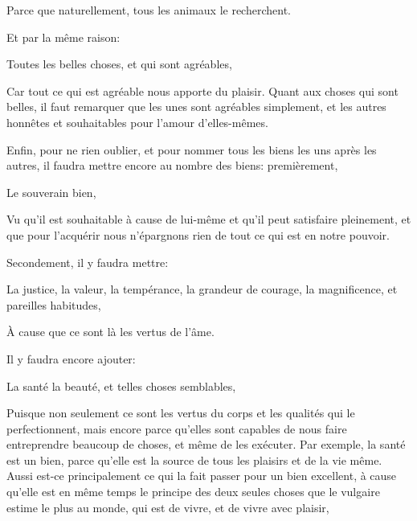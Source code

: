 Parce que naturellement, tous les animaux le recherchent.

\bigbreak

Et par la même raison:

\begin{emphpar}
	Toutes les belles choses, et qui sont agréables,
\end{emphpar}

Car tout ce qui est agréable nous apporte du plaisir. Quant aux choses qui sont belles, il faut remarquer que les unes sont
agréables simplement, et les autres honnêtes et souhaitables pour l'amour d'elles-mêmes. 

\bigbreak

Enfin, pour ne rien oublier, et pour nommer tous les biens les uns après les autres, il faudra mettre encore au nombre des
biens: premièrement,

\begin{emphpar}
	Le souverain bien,
\end{emphpar}

Vu qu'il est souhaitable à cause de lui-même et qu'il peut satisfaire pleinement, et que pour l'acquérir nous n'épargnons rien
de tout ce qui est en notre pouvoir.

\bigbreak

Secondement, il y faudra mettre:

\begin{emphpar}
	La justice, la valeur, la tempérance, la grandeur de courage, la magnificence, et pareilles habitudes,
\end{emphpar}

À cause que ce sont là les vertus de l'âme. 

\bigbreak

Il y faudra encore ajouter:

\begin{emphpar}
	La santé la beauté, et telles choses semblables,
\end{emphpar}

Puisque non seulement ce sont les vertus du corps et les qualités qui le perfectionnent, mais encore parce qu'elles sont capables
de nous faire entreprendre beaucoup de choses, et même de les exécuter. Par exemple, la santé est un bien, parce qu'elle est la
source de tous les plaisirs et de la vie même. Aussi est-ce principalement ce qui la fait passer pour un bien excellent, à cause
qu'elle est en même temps le principe des deux seules choses que le vulgaire estime le plus au monde, qui est de vivre, et de vivre
avec plaisir, 

